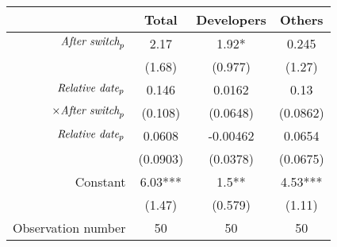 \begin{tabular}{|r|c|c|c|}
\hline
&  Total & Developers & Others \\
\hline
$\mbox{\emph{After switch}}_p$ & 2.17 & 1.92* & 0.245 \\
 & (1.68) & (0.977) & (1.27) \\
\hline
$\mbox{\emph{Relative date}}_p$ & 0.146 & 0.0162 & 0.13 \\
$\times \mbox{\emph{After switch}}_p$ & (0.108) & (0.0648) & (0.0862) \\
\hline
$\mbox{\emph{Relative date}}_p$ & 0.0608 & -0.00462 & 0.0654 \\
 & (0.0903) & (0.0378) & (0.0675) \\
\hline
Constant & 6.03*** & 1.5** & 4.53*** \\
 & (1.47) & (0.579) & (1.11) \\
\hline
Observation number & 50 & 50 & 50 \\
\hline
\end{tabular}